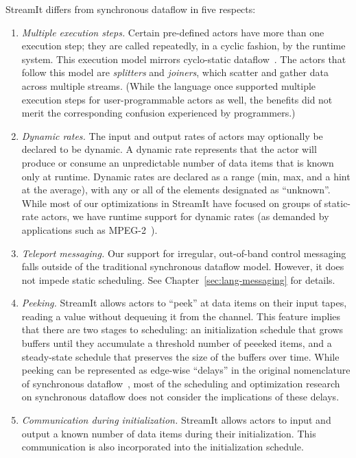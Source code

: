 StreamIt differs from synchronous dataflow in five respects:
\begin{enumerate}

\item {\it Multiple execution steps.}  Certain pre-defined actors have
  more than one execution step; they are called repeatedly, in a
  cyclic fashion, by the runtime system.  This execution model mirrors
  cyclo-static
  dataflow~\cite{bilsen_cyclo-static_1995,parks_comparison_1995}.  The
  actors that follow this model are {\it splitters} and {\it joiners},
  which scatter and gather data across multiple streams.  (While the
  language once supported multiple execution steps for
  user-programmable actors as well, the benefits did not merit the
  corresponding confusion experienced by programmers.)

\item {\it Dynamic rates.}  The input and output rates of actors may
  optionally be declared to be dynamic.  A dynamic rate represents
  that the actor will produce or consume an unpredictable number of
  data items that is known only at runtime.  Dynamic rates are
  declared as a range (min, max, and a hint at the average), with any
  or all of the elements designated as ``unknown''.  While most of our
  optimizations in StreamIt have focused on groups of static-rate
  actors, we have runtime support for dynamic rates (as demanded by
  applications such as MPEG-2~\cite{drake-ipdps06}).

\item {\it Teleport messaging.}  Our support for irregular,
  out-of-band control messaging falls outside of the traditional
  synchronous dataflow model.  However, it does not impede static
  scheduling.  See Chapter~\ref{sec:lang-messaging} for details.

\item {\it Peeking.}  StreamIt allows actors to ``peek'' at data items
  on their input tapes, reading a value without dequeuing it from the
  channel.  This feature implies that there are two stages to
  scheduling: an initialization schedule that grows buffers until they
  accumulate a threshold number of peeeked items, and a steady-state
  schedule that preserves the size of the buffers over time.  While
  peeking can be represented as edge-wise ``delays'' in the original
  nomenclature of synchronous dataflow~\cite{lee_static_1987}, most of
  the scheduling and optimization research on synchronous dataflow
  does not consider the implications of these delays.

\item {\it Communication during initialization.}  StreamIt allows
  actors to input and output a known number of data items during their
  initialization.  This communication is also incorporated into the
  initialization schedule.

\end{enumerate}

